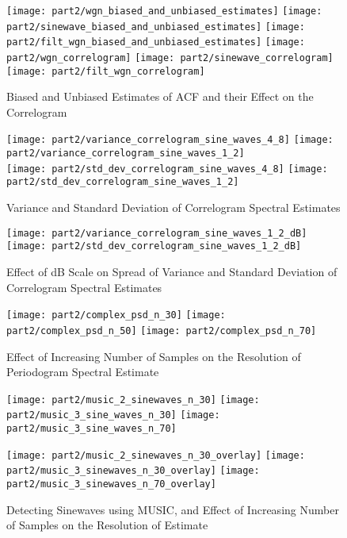 \begin{figure}[H]
\centering{}
\texttt{[image: part2/wgn\_biased\_and\_unbiased\_estimates]}
\texttt{[image: part2/sinewave\_biased\_and\_unbiased\_estimates]}
\texttt{[image: part2/filt\_wgn\_biased\_and\_unbiased\_estimates]}
\texttt{[image: part2/wgn\_correlogram]}
\texttt{[image: part2/sinewave\_correlogram]}
\texttt{[image: part2/filt\_wgn\_correlogram]}
\caption{Biased and Unbiased Estimates of ACF and their Effect on the Correlogram}
\end{figure}

\begin{figure}[H]
\centering{}
\texttt{[image: part2/variance\_correlogram\_sine\_waves\_4\_8]}
\texttt{[image: part2/variance\_correlogram\_sine\_waves\_1\_2]} \\
\texttt{[image: part2/std\_dev\_correlogram\_sine\_waves\_4\_8]}
\texttt{[image: part2/std\_dev\_correlogram\_sine\_waves\_1\_2]}
\caption{Variance and Standard Deviation of Correlogram Spectral Estimates}
\end{figure}

\begin{figure}[H]
\centering{}
\texttt{[image: part2/variance\_correlogram\_sine\_waves\_1\_2\_dB]}
\texttt{[image: part2/std\_dev\_correlogram\_sine\_waves\_1\_2\_dB]}
\caption{Effect of dB Scale on Spread of Variance and Standard Deviation of Correlogram Spectral Estimates}
\end{figure}


\begin{figure}[H]
\centering{}
\texttt{[image: part2/complex\_psd\_n\_30]}
\texttt{[image: part2/complex\_psd\_n\_50]}
\texttt{[image: part2/complex\_psd\_n\_70]}
\caption{Effect of Increasing Number of Samples on the Resolution of Periodogram Spectral Estimate}
\end{figure}


\begin{figure}[H]
\centering{}
\texttt{[image: part2/music\_2\_sinewaves\_n\_30]}
\texttt{[image: part2/music\_3\_sine\_waves\_n\_30]}
\texttt{[image: part2/music\_3\_sine\_waves\_n\_70]}

\texttt{[image: part2/music\_2\_sinewaves\_n\_30\_overlay]}
\texttt{[image: part2/music\_3\_sinewaves\_n\_30\_overlay]}
\texttt{[image: part2/music\_3\_sinewaves\_n\_70\_overlay]}
\caption{Detecting Sinewaves using MUSIC, and Effect of Increasing Number of Samples on the Resolution of Estimate}
\end{figure}



